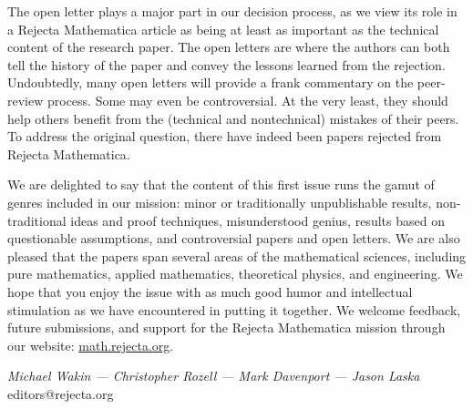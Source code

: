 \documentclass[12pt]{article}
\begin{document}
The open letter plays a major part in our decision process, as we
view its role in a Rejecta Mathematica article as being at least as
important as the technical content of the research paper. The open
letters are where the authors can both tell the history of the
paper and convey the lessons learned from the rejection.
Undoubtedly, many open letters will provide a frank commentary on
the peer-review process. Some may even be controversial. At the very
least, they should help others benefit from the (technical and
nontechnical) mistakes of their peers. To address the original
question, there have indeed been papers rejected from Rejecta
Mathematica.

We are delighted to say that the content of this first issue runs
the gamut of genres included in our mission: minor or traditionally
unpublishable results, non-traditional ideas and proof techniques,
misunderstood genius, results based on questionable assumptions, and
controversial papers and open letters. We are also pleased that the
papers span several areas of the mathematical sciences, including
pure mathematics, applied mathematics, theoretical physics, and
engineering. We hope that you enjoy the issue with as much good
humor and intellectual stimulation as we have encountered in putting
it together.  We welcome feedback, future submissions, and support
for the Rejecta Mathematica mission through our website:
\url{math.rejecta.org}.

\hfill
\begin{flushright}
\emph{Michael  Wakin --- Christopher  Rozell --- Mark  Davenport --- Jason  Laska}\\
{\footnotesize \textsf{editors@rejecta.org}\\}
\end{flushright}

\small


\end{document}
